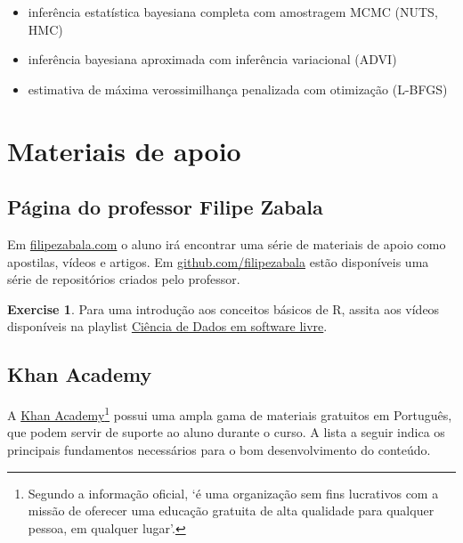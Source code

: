\documentclass[
]{book}
\providecommand{\tightlist}{%
  \setlength{\itemsep}{0pt}\setlength{\parskip}{0pt}}
\theoremstyle{definition}
\theoremstyle{definition}
\theoremstyle{definition}
\newtheorem{exercise}{Exercise}[chapter]
\theoremstyle{remark}
\begin{document}
\begin{itemize}
\tightlist
\item
  inferência estatística bayesiana completa com amostragem MCMC (NUTS, HMC)\\
\item
  inferência bayesiana aproximada com inferência variacional (ADVI)\\
\item
  estimativa de máxima verossimilhança penalizada com otimização (L-BFGS)
\end{itemize}

\hypertarget{materiais-de-apoio}{%
\section{Materiais de apoio}\label{materiais-de-apoio}}

\hypertarget{puxe1gina-do-professor-filipe-zabala}{%
\subsection{Página do professor Filipe Zabala}\label{puxe1gina-do-professor-filipe-zabala}}

Em \href{http://filipezabala.com/}{filipezabala.com} o aluno irá encontrar uma série de materiais de apoio como apostilas, vídeos e artigos. Em \href{https://github.com/filipezabala}{github.com/filipezabala} estão disponíveis uma série de repositórios criados pelo professor.

\begin{exercise}
\protect\hypertarget{exr:videoR}{}{\label{exr:videoR} }Para uma introdução aos conceitos básicos de R, assita aos vídeos disponíveis na playlist \href{https://www.youtube.com/playlist?list=PLgnUrXr7_7coSfm067nFXPvShO18o6GQ_}{Ciência de Dados em software livre}.
\end{exercise}

\hypertarget{khan-academy}{%
\subsection{Khan Academy}\label{khan-academy}}

A \href{https://pt.khanacademy.org}{Khan Academy}\footnote{Segundo a informação oficial, `é uma organização sem fins lucrativos com a missão de oferecer uma educação gratuita de alta qualidade para qualquer pessoa, em qualquer lugar'.} possui uma ampla gama de materiais gratuitos em Português, que podem servir de suporte ao aluno durante o curso. A lista a seguir indica os principais fundamentos necessários para o bom desenvolvimento do conteúdo.
\end{document}
